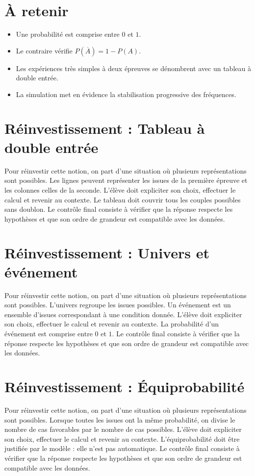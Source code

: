 \section{À retenir}
\begin{aretenir}
\begin{itemize}
\item Une probabilité est comprise entre $0$ et $1$.
\item Le contraire vérifie $P(\overline A)=1-P(A)$.
\item Les expériences très simples à deux épreuves se dénombrent avec un tableau à double entrée.
\item La simulation met en évidence la stabilisation progressive des fréquences.
\end{itemize}
\end{aretenir}

\section{Réinvestissement : Tableau à double entrée}
Pour réinvestir cette notion, on part d’une situation où plusieurs représentations sont possibles. Les lignes peuvent représenter les issues de la première épreuve et les colonnes celles de la seconde. L’élève doit expliciter son choix, effectuer le calcul et revenir au contexte. Le tableau doit couvrir tous les couples possibles sans doublon. Le contrôle final consiste à vérifier que la réponse respecte les hypothèses et que son ordre de grandeur est compatible avec les données.

\section{Réinvestissement : Univers et événement}
Pour réinvestir cette notion, on part d’une situation où plusieurs représentations sont possibles. L’univers regroupe les issues possibles. Un événement est un ensemble d’issues correspondant à une condition donnée. L’élève doit expliciter son choix, effectuer le calcul et revenir au contexte. La probabilité d’un événement est comprise entre $0$ et $1$. Le contrôle final consiste à vérifier que la réponse respecte les hypothèses et que son ordre de grandeur est compatible avec les données.

\section{Réinvestissement : Équiprobabilité}
Pour réinvestir cette notion, on part d’une situation où plusieurs représentations sont possibles. Lorsque toutes les issues ont la même probabilité, on divise le nombre de cas favorables par le nombre de cas possibles. L’élève doit expliciter son choix, effectuer le calcul et revenir au contexte. L’équiprobabilité doit être justifiée par le modèle : elle n’est pas automatique. Le contrôle final consiste à vérifier que la réponse respecte les hypothèses et que son ordre de grandeur est compatible avec les données.
